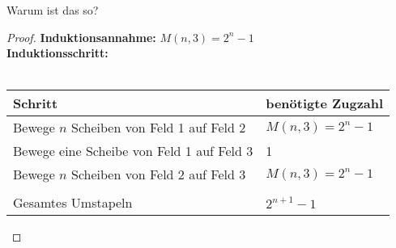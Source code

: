 \begin{frame}{Warum ist das so?}
    \begin{proof}
    \textbf{Induktionsannahme:} $M(n,3) = 2^n-1$\\
    \textbf{Induktionsschritt:}\\\ \\
        \begin{tabular}{l|l}
        Schritt & benötigte Zugzahl\\
        \hline
        Bewege $n$ Scheiben von Feld 1 auf Feld 2& $M(n,3) = 2^n-1$\\
        Bewege eine Scheibe von Feld 1 auf Feld 3&1\\
        Bewege $n$ Scheiben von Feld 2 auf Feld 3 & $M(n,3) = 2^n-1$\\
        &\\
        Gesamtes Umstapeln & $2^{n+1}-1$
    \end{tabular}
    \end{proof}
\end{frame}